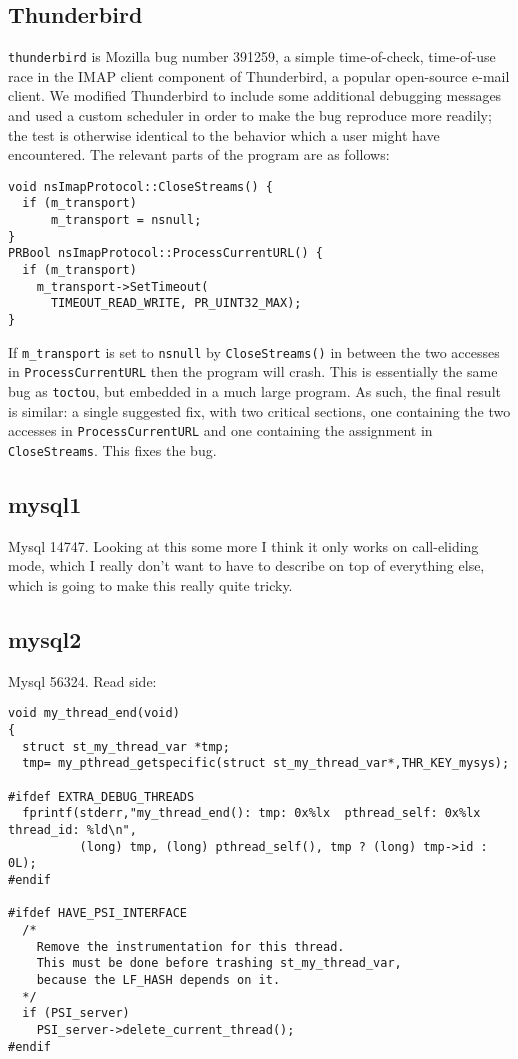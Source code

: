 \subsection{Thunderbird}


\verb|thunderbird| is Mozilla bug number
391259\cite{thunderbird39125}, a simple time-of-check, time-of-use
race in the IMAP client component of Thunderbird, a popular
open-source e-mail client.  We modified Thunderbird to include some
additional debugging messages and used a custom scheduler in order to
make the bug reproduce more readily; the test is otherwise identical
to the behavior which a user might have encountered.  The relevant
parts of the program are as follows:

\begin{verbatim}
void nsImapProtocol::CloseStreams() {
  if (m_transport)
      m_transport = nsnull;
}
PRBool nsImapProtocol::ProcessCurrentURL() {
  if (m_transport)
    m_transport->SetTimeout(
      TIMEOUT_READ_WRITE, PR_UINT32_MAX);
}
\end{verbatim}

\noindent
If \verb|m_transport| is set to \verb|nsnull| by \verb|CloseStreams()|
in between the two accesses in \verb|ProcessCurrentURL| then the
program will crash.  This is essentially the same bug as
\verb|toctou|, but embedded in a much large program.  As such, the
final result is similar: a single suggested fix, with two critical
sections, one containing the two accesses in \verb|ProcessCurrentURL|
and one containing the assignment in \verb|CloseStreams|.  This fixes
the bug.

\subsection{mysql1}

Mysql 14747.  Looking at this some more I think it only works on
call-eliding mode, which I really don't want to have to describe on
top of everything else, which is going to make this really quite
tricky.

\subsection{mysql2}

Mysql 56324.  Read side:

\begin{verbatim}
void my_thread_end(void)
{
  struct st_my_thread_var *tmp;
  tmp= my_pthread_getspecific(struct st_my_thread_var*,THR_KEY_mysys);

#ifdef EXTRA_DEBUG_THREADS
  fprintf(stderr,"my_thread_end(): tmp: 0x%lx  pthread_self: 0x%lx  thread_id: %ld\n",
          (long) tmp, (long) pthread_self(), tmp ? (long) tmp->id : 0L);
#endif

#ifdef HAVE_PSI_INTERFACE
  /*
    Remove the instrumentation for this thread.
    This must be done before trashing st_my_thread_var,
    because the LF_HASH depends on it.
  */
  if (PSI_server)
    PSI_server->delete_current_thread();
#endif
\end{verbatim}

